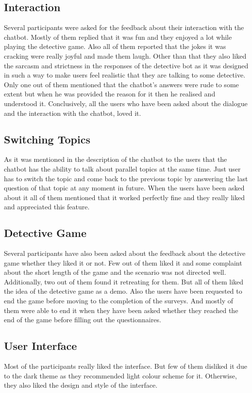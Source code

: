 \subsection{Interaction}
Several participants were asked for the feedback about their interaction with the chatbot. Mostly of them replied that it was fun and they enjoyed a lot while playing the detective game. Also all of them reported that the jokes it was cracking were really joyful and made them laugh. Other than that they also liked the sarcasm and strictness in the responses of the detective bot as it was designed in such a way to make users feel realistic that they are talking to some detective. Only one out of them mentioned that the chatbot's answers were rude to some extent but when he was provided the reason for it then he realised and understood it. Conclusively, all the users who have been asked about the dialogue and the interaction with the chatbot, loved it.

\subsection{Switching Topics}
As it was mentioned in the description of the chatbot to the users that the chatbot has the ability to talk about parallel topics at the same time. Just user has to switch the topic and come back to the previous topic by answering the last question of that topic at any moment in future. When the users have been asked about it all of them mentioned that it worked perfectly fine and they really liked and appreciated this feature.

\subsection{Detective Game}
Several participants have also been asked about the feedback about the detective game whether they liked it or not. Few out of them liked it and some complaint about the short length of the game and the scenario was not directed well. Additionally, two out of them found it retreating for them. But all of them liked the idea of the detective game as a demo. Also the users have been requested to end the game before moving to the completion of the surveys. And mostly of them were able to end it when they have been asked whether they reached the end of the game before filling out the questionnaires.

\subsection{User Interface}
Most of the participants really liked the interface. But few of them disliked it due to the dark theme as they recommended light colour scheme for it. Otherwise, they also liked the design and style of the interface.  


